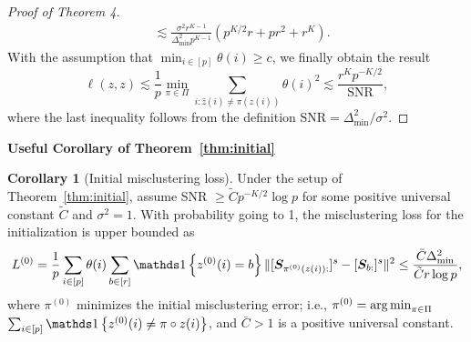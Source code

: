\documentclass[lettersize,onecolumn,journal]{IEEEtran}
\theoremstyle{definition}
\newtheorem{cor}{Corollary}
\theoremstyle{definition}
\newcommand{\of}[1]{\left(#1\right)}
\newcommand{\offf}[1]{\left\{#1\right\}}
\begin{document}
\begin{proof}[Proof of Theorem 4]
\begin{align}
        & \lesssim \frac{\sigma^2 r^{K-1}}{ \Delta_{\min}^2  p^{K-1} } \of{ p^{K/2}r + pr^2 + r^K }.
    \end{align}
    With the assumption that $\min_{i \in [p]} \theta(i) \geq c$, we finally obtain the result
    \begin{equation}
        \ell(z, z) \lesssim \frac{1}{p}\min_{\pi \in \Pi} \sum_{i : \hat z(i) \neq \pi(z(i))} \theta(i)^2 \lesssim \frac{r^K p^{-K/2} }{ \text{SNR} },
    \end{equation}
    where the last inequality follows from the definition $\text{SNR} = \Delta_{\min}^2/\sigma^2$.
\end{proof}

{\bf Useful Corollary of Theorem~\ref{thm:initial}} 

\begin{cor}[Initial misclustering loss]\label{cor:L0} 
Under the setup of Theorem~\ref{thm:initial}, assume SNR $\geq \tilde  C p^{-K/2} \log p$ for some positive universal constant $\tilde C$ and $\sigma^2 = 1$. With probability going to 1, the misclustering loss for the initialization is upper bounded as 
\begin{equation}
    L^{(0)} =  \frac{1}{p}  \sum_{i \in [p]} \theta(i) \sum_{b \in [r]}  \ind \offf{ z^{(0)}(i) = b } \onormSize{}{ [ \mS_{ \pi^{(0)}( z(i)):}  ]^s - [ \mS_{b:}  ]^s  }^2 \leq \frac{\bar C \Delta_{\min}^2}{ \tilde C r \log p},
\end{equation}
where $\pi^{(0)}$ minimizes the initial misclustering error; i.e., $\pi^{(0)} = \operatorname*{arg\,min}_{\pi \in \Pi} $ $ \sum_{i \in [p]}\ind \offf{z^{(0)}(i) \neq \pi \circ z(i) }$, and $\bar C > 1$ is a positive universal constant.
\end{cor}
\end{document}
